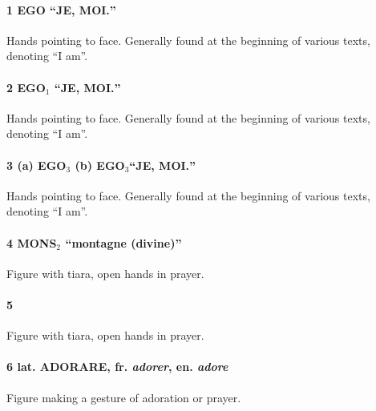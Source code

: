 {\parindent0pt
\paragraph{\bfseries\large 1 {\anatolian \scalebox{2.5}{\ego}} EGO \foreignquote{french}{JE, MOI.}} 
\medskip
Hands pointing to face. Generally found at the beginning of various texts, denoting \enquote{I am}.

\paragraph{\bfseries\large 2 {\anatolian \scalebox{2.5}{\egoi}} EGO$_1$ \foreignquote{french}{JE, MOI.}} 
\medskip
Hands pointing to face. Generally found at the beginning of various texts, denoting \enquote{I am}.
 
\paragraph{\bfseries\large 3 (a){\anatolian \scalebox{2.5}{\egoii}} EGO$_3$  (b){\anatolian \scalebox{2.5}{\egoiv}} EGO$_3$\foreignquote{french}{JE, MOI.}} 
\medskip
Hands pointing to face. Generally found at the beginning of various texts, denoting \enquote{I am}.
 
\paragraph{\bfseries\large 4 {\anatolian \scalebox{2.5}{\monsii}} MONS$_2$ \foreignquote{french}{montagne (divine)}} 
\mbox{}
\smallskip

Figure with tiara, open hands in prayer.  
 
 
\paragraph{\bfseries\large 5  } 
\mbox{}
\smallskip

Figure with tiara, open hands in prayer.  
 
 
\paragraph{\bfseries\large *6  {\mdseries\small lat.} ADORARE, \mdseries \small fr. \textit{adorer}, en. \textit{adore}} 
\mbox{}
\smallskip

Figure making a gesture of adoration or prayer.  

}
